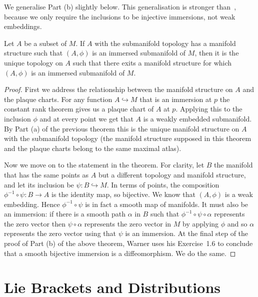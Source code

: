 We generalise Part (b) slightly below.
This generalisation is stronger than~\cite[Lem~2.1.41]{Sharpe1997}, because we only require the inclusions to be injective immersions, not weak embeddings.

\begin{theorem}
\label{thm:unique manifold structure}
Let $A$ be a subset of $M$. 
If $A$ with the submanifold topology has a manifold structure such that $(A,\phi)$ is an immersed submanifold of $M$, then it is the unique topology on $A$ such that there exits a manifold structure for which $(A,\phi)$ is an immersed submanifold of $M$.
\end{theorem}
\begin{proof}
First we address the relationship between the manifold structure on $A$ and the plaque charts.
For any function $A \hookrightarrow M$ that is an immersion at $p$ the constant rank theorem gives us a plaque chart of $A$ at $p$.
Applying this to the inclusion $\phi$ and at every point we get that $A$ is a weakly embedded submanifold.
By Part (a) of the previous theorem this is the unique manifold structure on $A$ with the submanifold topology (the manifold structure supposed in this theorem and the plaque charts belong to the same maximal atlas).

Now we move on to the statement in the theorem.
For clarity, let $B$ the manifold that has the same points as $A$ but a different topology and manifold structure, and let its inclusion be $\psi : B \hookrightarrow M$.
In terms of points, the composition $\phi^{-1} \circ \psi : B \to A$ is the identity map, so bijective.
We know that $(A,\phi)$ is a weak embedding.
Hence $\phi^{-1} \circ \psi$ is in fact a smooth map of manifolds.
It must also be an immersion: if there is a smooth path $\alpha$ in $B$ such that $\phi^{-1} \circ \psi \circ \alpha$ represents the zero vector then $\psi \circ \alpha$ represents the zero vector in $M$ by applying $\phi$ and so $\alpha$ represents the zero vector using that $\psi$ is an immersion. 
At the final step of the proof of Part (b) of the above theorem, Warner uses his Exercise~1.6 to conclude that a smooth bijective immersion is a diffeomorphism.
We do the same.
\end{proof}


\section{Lie Brackets and Distributions}

